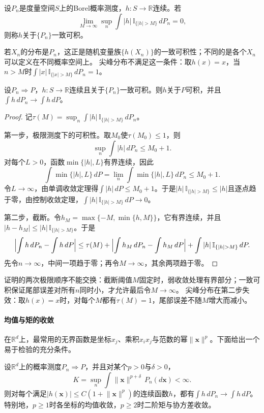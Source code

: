 \begin{definition}[沿分布列的一致可积]
\label{def:wlim-ui-sequence}
设$P_n$是度量空间$S$上的Borel概率测度，$h:S\to\mathbb R$连续。若
\[
  \lim_{M\to\infty}\sup_n\int|h|\,\mathbb I_{\{|h|>M\}}\,dP_n=0,
\]
则称$h$关于$\{P_n\}$一致可积。
\end{definition}

若$X_n$的分布是$P_n$，这正是随机变量族$\{h(X_n)\}$的一致可积性；不同的是各个$X_n$可以定义在不同概率空间上。
尖峰分布不满足这一条件：取$h(x)=x$，当$n>M$时$\int|x|\,\mathbb I_{\{|x|>M\}}\,dP_n=1$。

\begin{theorem}[一致可积下的积分极限]
\label{thm:wlim-ui-integral}
设$P_n\Rightarrow P$，$h:S\to\mathbb R$连续且关于$\{P_n\}$一致可积。则$h$关于$P$可积，并且$\int h\,dP_n\to\int h\,dP$。
\end{theorem}

\begin{proof}
记$\tau(M)=\sup_n\int|h|\,\mathbb I_{\{|h|>M\}}\,dP_n$。

第一步，极限测度下的可积性。取$M_0$使$\tau(M_0)\leq1$，则
\[
  \sup_n\int|h|\,dP_n\leq M_0+1.
\]
对每个$L>0$，函数$\min\{|h|,L\}$有界连续，因此
\[
  \int\min\{|h|,L\}\,dP=\lim_n\int\min\{|h|,L\}\,dP_n\leq M_0+1.
\]
令$L\to\infty$，由单调收敛定理得$\int|h|\,dP\leq M_0+1$。于是$|h|\,\mathbb I_{\{|h|>M\}}\leq|h|$且逐点趋于零，由控制收敛定理，$\int|h|\,\mathbb I_{\{|h|>M\}}\,dP\to0$。

第二步，截断。令$h_M=\max\{-M,\min\{h,M\}\}$，它有界连续，并且$|h-h_M|\leq|h|\,\mathbb I_{\{|h|>M\}}$。于是
\[
  \Bigl|\int h\,dP_n-\int h\,dP\Bigr|\leq\tau(M)+\Bigl|\int h_M\,dP_n-\int h_M\,dP\Bigr|+\int|h|\,\mathbb I_{\{|h|>M\}}\,dP.
\]
先令$n\to\infty$，中间一项趋于零；再令$M\to\infty$，其余两项趋于零。
\end{proof}

证明的两次极限顺序不能交换：截断阈值$M$固定时，弱收敛处理有界部分；一致可积保证尾部误差对所有$n$同时小，才允许最后令$M\to\infty$。
尖峰分布在第二步失效：取$h(x)=x$时，对每个$M$都有$\tau(M)=1$，尾部误差不随$M$增大而减小。

\paragraph{均值与矩的收敛}
在$\mathbb R^d$上，最常用的无界函数是坐标$x_j$、乘积$x_ix_j$与范数的幂$\lVert\bm x\rVert^p$。下面给出一个易于检验的充分条件。

\begin{theorem}[矩的收敛]
\label{thm:wlim-moment-convergence}
设$\mathbb R^d$上的概率测度$P_n\Rightarrow P$，并且对某个$p>0$与$\delta>0$，
\[
  K=\sup_n\int\lVert\bm x\rVert^{p+\delta}\,P_n(d\bm x)<\infty.
\]
则对每个满足$|h(\bm x)|\leq C(1+\lVert\bm x\rVert^p)$的连续函数$h$，都有$\int h\,dP_n\to\int h\,dP$。
特别地，$p\geq1$时各坐标的均值收敛，$p\geq2$时二阶矩与协方差收敛。
\end{theorem}

